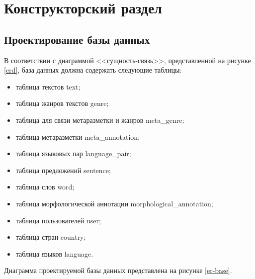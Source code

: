 \section{Конструкторский раздел}

\subsection{Проектирование базы данных}

В соответствии с диаграммой <<сущность-связь>>, представленной на рисунке \ref{erd}, база данных должна содержать следующие таблицы:

\begin{itemize}[label=---]
	\item таблица текстов text;
	
	\item таблица жанров текстов genre;
	
	\item таблица для связи метаразметки и жанров meta\_genre;
	
	\item таблица метаразметки meta\_annotation;
	
	\item таблица языковых пар language\_pair;
	
	\item таблица предложений sentence;
	
	\item таблица слов word;
	
	\item таблица морфологической аннотации morphological\_annotation;
	
	\item таблица пользователей user;
	
	\item таблица стран country;
	
	\item таблица языков language.
\end{itemize}

Диаграмма проектируемой базы данных представлена на рисунке \ref{er-base}.

